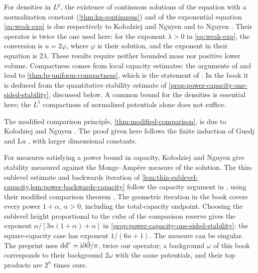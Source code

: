 For densities in $L^p$, the existence of continuous solutions of the equation with a normalization constant (\cref{thm:kn-continuous}) and of the exponential equation \eqref{eq:weak-exp} is due respectively to Ko{\l}odziej and Nguyen \cite[Theorem~0.1, p.~141]{KN15} and to Nguyen \cite[Theorem~0.1, p.~241]{Nguyen16}. Their operator is twice the one used here: for the exponent $\lambda>0$ in \eqref{eq:weak-exp}, the conversion is $u=2\varphi$, where $\varphi$ is their solution, and the exponent in their equation is $2\lambda$. These results require neither bounded mass nor positive lower volume. Compactness comes from local capacity estimates: the arguments of \cite[Section 5]{KN15} and \cite[Section~6, pp.~107--113]{Dinew16} lead to \cref{thm:lp-uniform-compactness}, which is the statement of \cite[Corollary~5.10, p.~156]{KN15}. In the book it is deduced from the quantitative stability estimate of \cref{prop:power-capacity-one-sided-stability}, discussed below. A common bound for the densities is essential here; the $L^1$ compactness of normalized potentials alone does not suffice.

The modified comparison principle, \cref{thm:modified-comparison}, is due to Ko{\l}odziej and Nguyen \cite[Theorem 0.2]{KN15}. The proof given here follows the finite induction of Guedj and Lu \cite[Theorem 1.5]{GL22}, with larger dimensional constants.

For measures satisfying a power bound in capacity, Ko{\l}odziej and Nguyen \cite[Proposition~2.4, pp.~2954--2956]{KNHolder18} give stability measured against the Monge--Amp\`ere measure of the solution. The thin-sublevel estimate and backwards iteration of \cref{lem:thin-sublevel-capacity,lem:power-backwards-capacity} follow the capacity argument in \cite[v2, Theorem~5.3 and Lemma~5.4, pp.~10--12]{KN15}, using their modified comparison theorem \cite[v2, Theorem~2.3, pp.~5--6]{KN15}. The geometric iteration in the book covers every power $1+\alpha$, $\alpha>0$, including the total-capacity endpoint. Choosing the sublevel height proportional to the cube of the comparison reserve gives the exponent $\alpha/[3n(1+\alpha)+\alpha]$ in \cref{prop:power-capacity-one-sided-stability}; the square-capacity case has exponent $1/(6n+1)$. The measure can be singular. The preprint \cite[v2, p.~1]{KN15} uses $\mathrm{dd}^{\mathrm{c}}=\mathrm i\partial\bar\partial/\pi$, twice our operator; a background $\omega$ of this book corresponds to their background $2\omega$ with the same potentials, and their top products are $2^n$ times ours.

